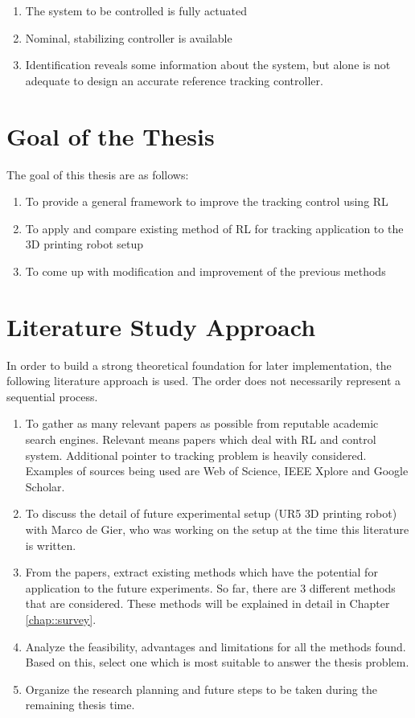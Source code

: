 \begin{enumerate}
	\item The system to be controlled is fully actuated
	\item Nominal, stabilizing controller is available	
	\item Identification reveals some information about the system, but alone is not adequate to design an accurate reference tracking controller.
\end{enumerate}

\section{Goal of the Thesis}

The goal of this thesis are as follows:
\begin{enumerate}
\item To provide a general framework to improve the tracking control using \acs{RL}
\item To apply and compare existing method of \acs{RL} for tracking application to the 3D printing robot setup
\item To come up with modification and improvement of the previous methods
\end{enumerate}

\section{Literature Study Approach}
In order to build a strong theoretical foundation for later implementation, the following literature approach is used. The order does not necessarily represent a sequential process.
\begin{enumerate}
	\item To gather as many relevant papers as possible from reputable academic search engines. Relevant means papers which deal with \acs{RL} and control system. Additional pointer to tracking problem is heavily considered. Examples of sources being used are Web of Science, IEEE Xplore and Google Scholar.
	\item To discuss the detail of future experimental setup (UR5 \acs{3D} printing robot) with Marco de Gier, who was working on the setup at the time this literature is written.
	\item From the papers, extract existing methods which have the potential for application to the future experiments. So far, there are 3 different methods that are considered. These methods will be explained in detail in Chapter \ref{chap::survey}.
	\item Analyze the feasibility, advantages and limitations for all the methods found. Based on this, select one which is most suitable to answer the thesis problem.
	\item Organize the research planning and future steps to be taken during the remaining thesis time.
	
\end{enumerate}


